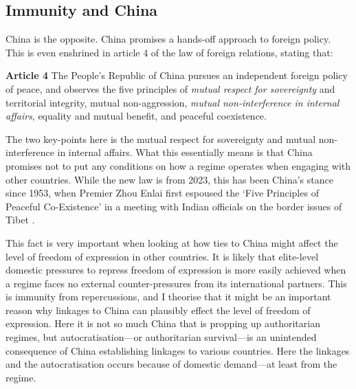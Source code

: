 \subsection{Immunity and China}

China is the opposite. China promises a hands-off approach to foreign policy. This is even enshrined in article 4 of the law of foreign relations, stating that:
\begin{displayquote}
\textbf{Article 4} The People's Republic of China pursues an independent foreign policy of peace, and observes the five principles of \textit{mutual respect for sovereignty} and territorial integrity, mutual non-aggression, \textit{mutual non-interference in internal affairs}, equality and mutual benefit, and peaceful coexistence. \citep[emphases are my own]{xinhua_law_2023}
\end{displayquote}
The two key-points here is the mutual respect for sovereignty and mutual non-interference in internal affairs. What this essentially means is that China promises not to put any conditions on how a regime operates when engaging with other countries. While the new law is from 2023, this has been China's stance since 1953, when Premier Zhou Enlai first espoused the `Five Principles of Peaceful Co-Existence' in a meeting with Indian officials on the border issues of Tibet \citep{zhonghua_renmin_gongheguo_jiaowenbu_ministry_of_foreign_affairs_of_the_peoples_republic_of_china_zhongguo_2000}.

This fact is very important when looking at how ties to China might affect the level of freedom of expression in other countries. It is likely that elite-level domestic pressures to repress freedom of expression is more easily achieved when a regime faces no external counter-pressures from its international partners. This is immunity from repercussions, and I theorise that it might be an important reason why linkages to China can plausibly effect the level of freedom of expression. Here it is not so much China that is propping up authoritarian regimes, but autocratisation---or authoritarian survival---is an unintended consequence of China establishing linkages to various countries. Here the linkages and the autocratisation occurs because of domestic demand---at least from the regime.

